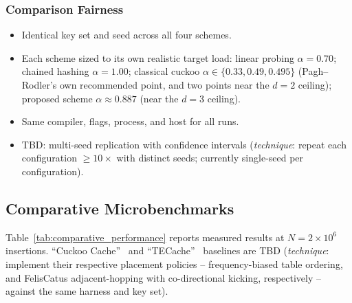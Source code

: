 \documentclass[conference]{IEEEtran}
\begin{document}
	\subsubsection{Comparison Fairness}
	\begin{itemize}
		\item Identical key set and seed across all four schemes.
		\item Each scheme sized to its own realistic target load: linear
		probing $\alpha=0.70$; chained hashing $\alpha=1.00$; classical
		cuckoo $\alpha\in\{0.33, 0.49, 0.495\}$ (Pagh--Rodler's own
		recommended point, and two points near the $d=2$ ceiling); proposed
		scheme $\alpha\approx 0.887$ (near the $d=3$ ceiling).
		\item Same compiler, flags, process, and host for all runs.
		\item TBD: multi-seed replication with confidence intervals
		(\emph{technique}: repeat each configuration $\ge\!10\times$ with
		distinct seeds; currently single-seed per configuration).
	\end{itemize}
	
	\subsection{Comparative Microbenchmarks}
	Table~\ref{tab:comparative_performance} reports measured results at
	$N=2\times10^6$ insertions. ``Cuckoo Cache''~\cite{pontarelli2016cuckoocache}
	and ``TECache''~\cite{xiong2025tecache} baselines are TBD
	(\emph{technique}: implement their respective placement policies --
	frequency-biased table ordering, and FelisCatus adjacent-hopping with
	co-directional kicking, respectively -- against the same harness and
	key set).
	
	\begin{table}[t]
		\caption{Comparative Microbenchmarks, Measured ($N=2\times10^6$ Insertions, Single-vCPU KVM Host)}
		\label{tab:comparative_performance}
		\centering
	\end{table}
	
\end{document}
